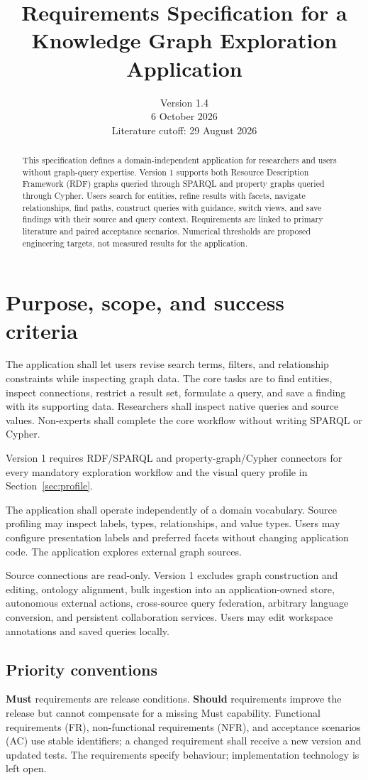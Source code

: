 \documentclass[11pt,a4paper]{article}
\title{Requirements Specification for a\\Knowledge Graph Exploration Application}
\author{}
\date{Version 1.4\\6 October 2026\\Literature cutoff: 29 August 2026}
\begin{document}
\maketitle
\begin{abstract}
This specification defines a domain-independent application for researchers and users without graph-query expertise. Version 1 supports both Resource Description Framework (RDF) graphs queried through SPARQL and property graphs queried through Cypher. Users search for entities, refine results with facets, navigate relationships, find paths, construct queries with guidance, switch views, and save findings with their source and query context. Requirements are linked to primary literature and paired acceptance scenarios. Numerical thresholds are proposed engineering targets, not measured results for the application.
\end{abstract}
\tableofcontents
\newpage

\section{Purpose, scope, and success criteria}
The application shall let users revise search terms, filters, and relationship constraints while inspecting graph data. The core tasks are to find entities, inspect connections, restrict a result set, formulate a query, and save a finding with its supporting data. Researchers shall inspect native queries and source values. Non-experts shall complete the core workflow without writing SPARQL or Cypher.

Version 1 requires RDF/SPARQL and property-graph/Cypher connectors for every mandatory exploration workflow and the visual query profile in Section~\ref{sec:profile}.

The application shall operate independently of a domain vocabulary. Source profiling may inspect labels, types, relationships, and value types. Users may configure presentation labels and preferred facets without changing application code. The application explores external graph sources.

Source connections are read-only. Version 1 excludes graph construction and editing, ontology alignment, bulk ingestion into an application-owned store, autonomous external actions, cross-source query federation, arbitrary language conversion, and persistent collaboration services. Users may edit workspace annotations and saved queries locally.

\subsection{Priority conventions}
\textbf{Must} requirements are release conditions. \textbf{Should} requirements improve the release but cannot compensate for a missing Must capability. Functional requirements (FR), non-functional requirements (NFR), and acceptance scenarios (AC) use stable identifiers; a changed requirement shall receive a new version and updated tests. The requirements specify behaviour; implementation technology is left open.
\end{document}
